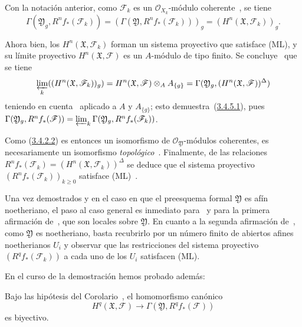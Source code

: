 \begin{env}[3.4.5]
Con la notación anterior, como $\mathcal F_k$ es un $\mathcal O_{X_k}$-módulo coherente~, se tiene
\[
\Gamma(\mathfrak Y_g,R^nf_*(\mathcal F_k))
=(\Gamma(\mathfrak Y,R^nf_*(\mathcal F_k)))_g
=(H^n(\mathfrak X,\mathcal F_k))_g.
\]

Ahora bien, los $H^n(\mathfrak X,\mathcal F_k)$ forman un sistema proyectivo que satisface (ML), y su límite proyectivo $H^n(\mathfrak X,\mathcal F)$ es un $A$-módulo de tipo finito.
Se concluye~ que se tiene
\[
\varprojlim_k((H^n(\mathfrak X,\mathcal F_k))_g)
=H^n(\mathfrak X,\mathcal F)\otimes_AA_{\{g\}}
=\Gamma(\mathfrak Y_g,(H^n(\mathfrak X,\mathcal F))^\Delta)
\]
teniendo en cuenta~ aplicado a $A$ y $A_{\{g\}}$; esto demuestra~(\hyperref[III.3.4.5.1]{3.4.5.1}), pues $\Gamma(\mathfrak Y_g,R^nf_*(\mathcal F))
=\varprojlim_k\Gamma(\mathfrak Y_g,R^nf_*(\mathcal F_k))$.

Como (\hyperref[III.3.4.2.2]{3.4.2.2}) es entonces un isomorfismo de $\mathcal O_{\mathfrak Y}$-módulos coherentes, es necesariamente un isomorfismo \emph{topológico}~.
Finalmente, de las relaciones $R^nf_*(\mathcal F_k)=(H^n(\mathfrak X,\mathcal F_k))^\Delta$ se deduce que el sistema proyectivo $(R^nf_*(\mathcal F_k))_{k\geq0}$ satisface (ML)~.

Una vez demostrados  y  en el caso en que el preesquema formal $\mathfrak Y$ es afín noetheriano, el paso al caso general es inmediato para~ y para la primera afirmación de~, que son locales sobre $\mathfrak Y$.
En cuanto a la segunda afirmación de~, como $\mathfrak Y$ es noetheriano, basta recubrirlo por un número finito de abiertos afines noetherianos $U_i$ y observar que las restricciones del sistema proyectivo $(R^qf_*(\mathcal F_k))$ a cada uno de los $U_i$ satisfacen (ML).
\end{env}

En el curso de la demostración hemos probado además:
\begin{corollary}[3.4.6]
\label{III.3.4.6}
\label{III.3.4.6-fr}
Bajo las hipótesis del Corolario~, el homomorfismo canónico
\[
H^q(\mathfrak X,\mathcal F)
\longrightarrow\Gamma(\mathfrak Y,R^qf_*(\mathcal F))
\tag{3.4.6.1}\label{III.3.4.6.1-fr}
\]
es biyectivo.
\end{corollary}
